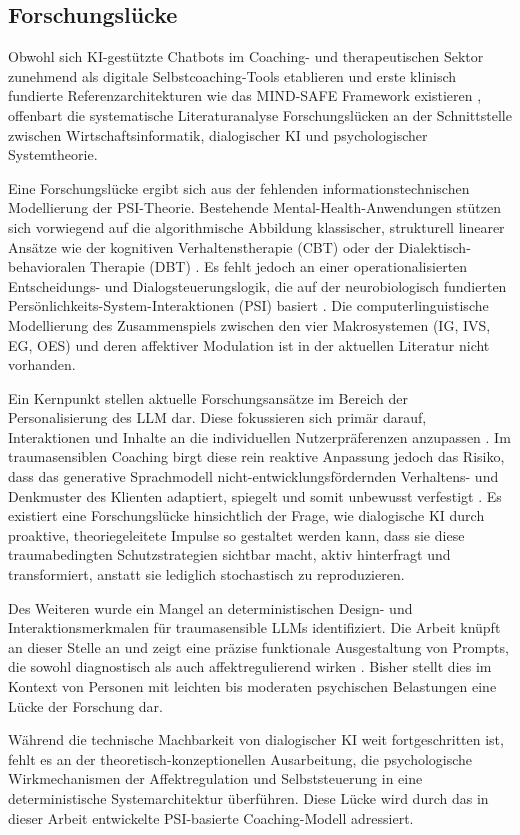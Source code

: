 \subsection{Forschungslücke}

Obwohl sich KI-gestützte Chatbots im Coaching- und therapeutischen Sektor zunehmend als digitale Selbstcoaching-Tools etablieren \citep{mai2023chatbots} und erste klinisch fundierte Referenzarchitekturen wie das MIND-SAFE Framework existieren \citep{boit2025prompt}, offenbart die systematische Literaturanalyse Forschungslücken an der Schnittstelle zwischen Wirtschaftsinformatik, dialogischer KI und psychologischer Systemtheorie.

Eine Forschungslücke ergibt sich aus der fehlenden informationstechnischen Modellierung der PSI-Theorie. Bestehende Mental-Health-Anwendungen stützen sich vorwiegend auf die algorithmische Abbildung klassischer, strukturell linearer Ansätze wie der kognitiven Verhaltenstherapie (CBT) oder der Dialektisch-behavioralen Therapie (DBT) \citep{boit2025prompt}. Es fehlt jedoch an einer operationalisierten Entscheidungs- und Dialogsteuerungslogik, die auf der neurobiologisch fundierten Persönlichkeits-System-Interaktionen (PSI) basiert \citep{Kuhl2000The}. Die computerlinguistische Modellierung des Zusammenspiels zwischen den vier Makrosystemen (IG, IVS, EG, OES) und deren affektiver Modulation ist in der aktuellen Literatur nicht vorhanden.
    
Ein Kernpunkt stellen aktuelle Forschungsansätze im Bereich der Personalisierung des LLM dar. Diese fokussieren sich primär darauf, Interaktionen und Inhalte an die individuellen Nutzerpräferenzen anzupassen \citep{Tan2024}. Im traumasensiblen Coaching birgt diese rein reaktive Anpassung jedoch das Risiko, dass das generative Sprachmodell nicht-entwicklungsfördernden Verhaltens- und Denkmuster des Klienten adaptiert, spiegelt und somit unbewusst verfestigt \citep{Xiao2025Humanizing}. Es existiert eine Forschungslücke hinsichtlich der Frage, wie dialogische KI durch proaktive, theoriegeleitete Impulse so gestaltet werden kann, dass sie diese traumabedingten Schutzstrategien sichtbar macht, aktiv hinterfragt und transformiert, anstatt sie lediglich stochastisch zu reproduzieren.

Des Weiteren wurde ein Mangel an deterministischen Design- und Interaktionsmerkmalen für traumasensible LLMs identifiziert. Die Arbeit knüpft an dieser Stelle an und zeigt eine präzise funktionale Ausgestaltung von Prompts, die sowohl diagnostisch als auch affektregulierend wirken \citep{kuhl2004systemdiagnostik, Levine2010}. Bisher stellt dies im Kontext von Personen mit leichten bis moderaten psychischen Belastungen eine Lücke der Forschung dar.

Während die technische Machbarkeit von dialogischer KI weit fortgeschritten ist, fehlt es an der theoretisch-konzeptionellen Ausarbeitung, die psychologische Wirkmechanismen der Affektregulation und Selbststeuerung in eine deterministische Systemarchitektur überführen. Diese Lücke wird durch das in dieser Arbeit entwickelte PSI-basierte Coaching-Modell adressiert.
